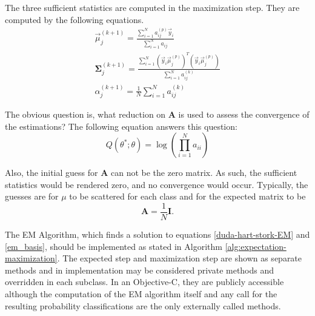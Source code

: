 \documentclass[11pt]{article}
\begin{document}
The three sufficient statistics are computed in the maximization step.   They are computed by the following equations.
\begin{eqnarray}
\vec{\mu} _j ^{(k+1)} = \frac{\sum_{i=1} ^N a_{ij}^{(p)} \vec{y}_i} {\sum_{i=1}^N a_{ij} } \\
\mathbf{\Sigma} _j ^{(k+1)} = \frac {\sum_{i=1}^N (\vec{y}_i \vec{\mu}_j ^{(p)} )^T(\vec{y}_i \vec{\mu}_j ^{(p)} ) } {\sum_{i=1}^N a^{(k)}_{ij}}  \\
\alpha _j ^ {(k+1)} = \frac{1}{N} \sum_{i=1}^N a^{(k)}_{ij}
\end{eqnarray}



The obvious question is, what reduction on $\mathbf{A}$ is used to assess the convergence of the estimations?  %
The following equation answers this question:
\begin{equation}
Q ( \theta ^* ; \theta ) =\log (\prod_{i=1} ^N  a_{ii} )
\end{equation}


Also, the initial guess for $\mathbf{A}$ can not be the zero matrix.  As such, the sufficient statistics would be rendered zero, and no convergence would occur.   Typically, the guesses are for $\mu$ to be scattered for each class and for the expected matrix to be 
\[ 
\mathbf{A} = \frac{1}{N} \mathbf{I}.
\]


The EM Algorithm, which finds a solution to equations \ref{duda-hart-stork-EM} and \ref{em_basis}, should be implemented as stated in %
Algorithm \ref{alg:expectation-maximization}.  %
The expected step and maximization step are shown as separate methods and in implementation may be considered private methods and overridden in each subclass.  In an Objective-C, they are publicly accessible although  the computation of the EM algorithm itself and any call for the resulting probability classifications are the only externally called methods.  %
\end{document}
